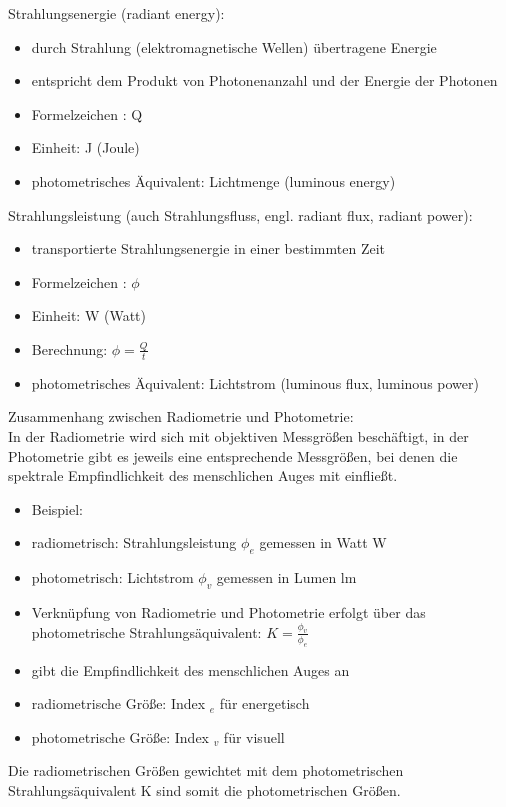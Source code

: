 \documentclass[10pt,landscape]{article}
\begin{document}
\begin{multicols}{3}
  Strahlungsenergie (radiant energy):
  \begin{itemize}
    \item durch Strahlung (elektromagnetische Wellen) übertragene Energie
    \item entspricht dem Produkt von Photonenanzahl und der Energie der Photonen
    \item Formelzeichen : Q
    \item Einheit: J (Joule)
    \item photometrisches Äquivalent: Lichtmenge (luminous energy)
  \end{itemize}
  
  Strahlungsleistung (auch Strahlungsfluss, engl. radiant flux, radiant power):
  \begin{itemize}
    \item transportierte Strahlungsenergie in einer bestimmten Zeit
    \item Formelzeichen : $\phi$
    \item Einheit: W (Watt)
    \item Berechnung: $\phi = \frac{Q}{t}$
    \item photometrisches Äquivalent: Lichtstrom (luminous flux, luminous power)
  \end{itemize}
  
  Zusammenhang zwischen Radiometrie und Photometrie:\\
  In der Radiometrie wird sich mit objektiven Messgrößen beschäftigt, in der Photometrie gibt es jeweils eine entsprechende Messgrößen, bei denen die spektrale Empfindlichkeit des menschlichen Auges mit einfließt.
  \begin{itemize}
    \item Beispiel:
    \item radiometrisch: Strahlungsleistung $\phi_e$ gemessen in Watt W
    \item photometrisch: Lichtstrom $\phi_v$ gemessen in Lumen lm
    \item Verknüpfung von Radiometrie und Photometrie erfolgt über das photometrische Strahlungsäquivalent: $K =\frac{\phi_v}{\phi_e}$
    \item gibt die Empfindlichkeit des menschlichen Auges an
    \item radiometrische Größe: Index $_e$ für energetisch
    \item photometrische Größe: Index $_v$ für visuell
  \end{itemize}
  Die radiometrischen Größen gewichtet mit dem photometrischen Strahlungsäquivalent K sind somit die photometrischen Größen.
  

\end{multicols}
\end{document}
